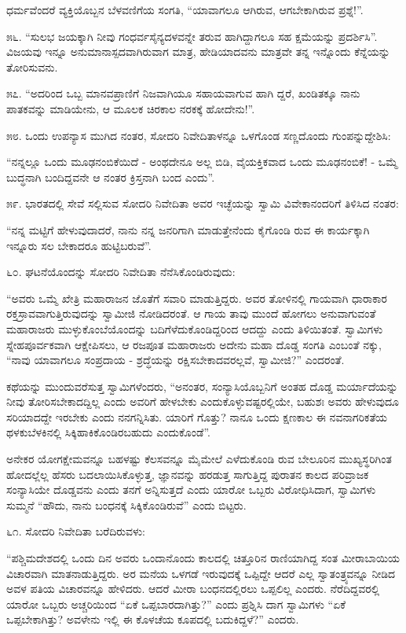 ಧರ್ಮವೆಂದರೆ ವ್ಯಕ್ತಿಯೊಬ್ಬನ ಬೆಳವಣಿಗೆಯ ಸಂಗತಿ, “ಯಾವಾಗಲೂ ಆಗಿರುವ, ಆಗಬೇಕಾಗಿರುವ ಪ್ರಶ್ನೆ!”. 

೫೬. “ಸುಲಭ ಜಯಕ್ಕಾಗಿ ನೀವು ಗಂಧರ್ವಸೈನ್ಯದಳವನ್ನೇ ತರುವ ಹಾಗಿದ್ದಾಗಲೂ ಸಹ ಕ್ಷಮೆಯನ್ನು ಪ್ರದರ್ಶಿಸಿ”. ವಿಜಯವು ಇನ್ನೂ ಅನುಮಾನಾಸ್ಪದವಾಗಿರುವಾಗ ಮಾತ್ರ, ಹೇಡಿಯಾದವನು ಮಾತ್ರವೇ ತನ್ನ ಇನ್ನೊಂದು ಕೆನ್ನೆಯನ್ನು ತೋರಿಸುವನು. 

೫೭. “ಅದರಿಂದ ಒಬ್ಬ ಮಾನವಪ್ರಾಣಿಗೆ ನಿಜವಾಗಿಯೂ ಸಹಾಯವಾಗುವ ಹಾಗಿ ದ್ದರೆ, ಖಂಡಿತಕ್ಕೂ ನಾನು ಪಾತಕವನ್ನು ಮಾಡಿಯೇನು, ಆ ಮೂಲಕ ಚಿರಕಾಲ ನರಕಕ್ಕೆ ಹೋದೇನು!”. 

೫೮. ಒಂದು ಉಪನ್ಯಾಸ ಮುಗಿದ ನಂತರ, ಸೋದರಿ ನಿವೇದಿತಾಳನ್ನೂ ಒಳಗೊಂಡ ಸಣ್ಣದೊಂದು ಗುಂಪನ್ನುದ್ದೇಶಿಸಿ:

“ನನ್ನಲ್ಲೂ ಒಂದು ಮೂಢನಂಬಿಕೆಯಿದೆ - ಅಂಥದೇನೂ ಅಲ್ಲ ಬಿಡಿ, ವೈಯಕ್ತಿಕವಾದ ಒಂದು ಮೂಢನಂಬಿಕೆ! - ಒಮ್ಮೆ ಬುದ್ಧನಾಗಿ ಬಂದಿದ್ದವನೇ ಆ ನಂತರ ಕ್ರಿಸ್ತನಾಗಿ ಬಂದ ಎಂದು”. 

೫೯. ಭಾರತದಲ್ಲಿ ಸೇವೆ ಸಲ್ಲಿಸುವ ಸೋದರಿ ನಿವೇದಿತಾ ಅವರ ಇಚ್ಛೆಯನ್ನು ಸ್ವಾಮಿ ವಿವೇಕಾನಂದರಿಗೆ ತಿಳಿಸಿದ ನಂತರ:

“ನನ್ನ ಮಟ್ಟಿಗೆ ಹೇಳುವುದಾದರೆ, ನಾನು ನನ್ನ ಜನರಿಗಾಗಿ ಮಾಡುತ್ತೇನೆಂದು ಕೈಗೊಂಡಿ ರುವ ಈ ಕಾರ್ಯಕ್ಕಾಗಿ ಇನ್ನೂರು ಸಲ ಬೇಕಾದರೂ ಹುಟ್ಟಿಬರುವೆ”. 

೬೦. ಘಟನೆಯೊಂದನ್ನು ಸೋದರಿ ನಿವೇದಿತಾ ನೆನೆಸಿಕೊಂಡಿರುವುದು:

“ಅವರು ಒಮ್ಮೆ ಖೇತ್ರಿ ಮಹಾರಾಜನ ಜೊತೆಗೆ ಸವಾರಿ ಮಾಡುತ್ತಿದ್ದರು. ಅವರ ತೋಳಿನಲ್ಲಿ ಗಾಯವಾಗಿ ಧಾರಾಕಾರ ರಕ್ತಸ್ರಾವವಾಗುತ್ತಿರುವುದನ್ನು ಸ್ವಾಮೀಜಿ ನೋಡಿದರಂತೆ. ಆ ಗಾಯ ತಾವು ಮುಂದೆ ಹೋಗಲು ಅನುವಾಗುವಂತೆ ಮಹಾರಾಜರು ಮುಳ್ಳುಕೊಂಬೆಯೊಂದನ್ನು ಬದಿಗೆಳೆದುಕೊಂಡಿದ್ದರಿಂದ ಆದದ್ದು ಎಂದು ತಿಳಿಯಿತಂತೆ. ಸ್ವಾಮಿಗಳು ಸ್ನೇಹಪೂರ್ವಕವಾಗಿ ಆಕ್ಷೇಪಿಸಲು, ಆ ರಜಪೂತ ಮಹಾರಾಜರು ಅದೇನು ಮಹಾ ದೊಡ್ಡ ಸಂಗತಿ ಎಂಬಂತೆ ನಕ್ಕು, “ನಾವು ಯಾವಾಗಲೂ ಸಂಪ್ರದಾಯ - ಶ್ರದ್ಧೆಯನ್ನು ರಕ್ಷಿಸಬೇಕಾದವರಲ್ಲವೆ, ಸ್ವಾಮೀಜಿ?” ಎಂದರಂತೆ.

ಕಥೆಯನ್ನು ಮುಂದುವರೆಸುತ್ತ ಸ್ವಾಮಿಗಳೆಂದರು, “ಅನಂತರ, ಸಂನ್ಯಾಸಿಯೊಬ್ಬನಿಗೆ ಅಂತಹ ದೊಡ್ಡ ಮರ್ಯಾದೆಯನ್ನು ನೀವು ತೋರಿಸಬೇಕಾದದ್ದಿಲ್ಲ ಎಂದು ಅವರಿಗೆ ಹೇಳಬೇಕು ಎಂದುಕೊಳ್ಳುವಷ್ಟರಲ್ಲಿಯೇ, ಬಹುಶಃ ಅವರು ಹೇಳುವುದೂ ಸರಿಯಾದದ್ದೇ ಇರಬೇಕು ಎಂದು ನನಗನ್ನಿಸಿತು. ಯಾರಿಗೆ ಗೊತ್ತು? ನಾನೂ ಒಂದು ಕ್ಷಣಕಾಲ ಈ ನವನಾಗರಿಕತೆಯ ಥಳಕುಬೆಳಕಿನಲ್ಲಿ ಸಿಕ್ಕಿಹಾಕಿಕೊಂಡಿರಬಹುದು ಎಂದುಕೊಂಡೆ”.

ಅನೇಕರ ಯೋಗಕ್ಷೇಮವನ್ನೂ ಬಹಳಷ್ಟು ಕೆಲಸವನ್ನೂ ಮೈಮೇಲೆ ಎಳೆದುಕೊಂಡಿ ರುವ ಬೇಲೂರಿನ ಮುಖ್ಯಸ್ಥರಿಗಿಂತ ಹೋದಲ್ಲೆಲ್ಲ ಹೆಸರು ಬದಲಾಯಿಸಿಕೊಳ್ಳುತ್ತ, ಜ್ಞಾನವನ್ನು ಹರಡುತ್ತ ಸಾಗುತ್ತಿದ್ದ ಪುರಾತನ ಕಾಲದ ಪರಿವ್ರಾಜಕ ಸಂನ್ಯಾಸಿಯೇ ದೊಡ್ಡವನು ಎಂದು ತನಗೆ ಅನ್ನಿಸುತ್ತದೆ ಎಂದು ಯಾರೋ ಒಬ್ಬರು ವಿರೋಧಿಸಿದಾಗ, ಸ್ವಾಮಿಗಳು ಸುಮ್ಮನೆ “ಹೌದು, ನಾನು ಬಂಧನಕ್ಕೆ ಸಿಕ್ಕಿಕೊಂಡಿರುವೆ” ಎಂದು ಬಿಟ್ಟರು. 

೬೧. ಸೋದರಿ ನಿವೇದಿತಾ ಬರೆದಿರುವಳು:

“ಪಶ್ಚಿಮದೇಶದಲ್ಲಿ ಒಂದು ದಿನ ಅವರು ಒಂದಾನೊಂದು ಕಾಲದಲ್ಲಿ ಚಿತ್ತೂರಿನ ರಾಣಿಯಾಗಿದ್ದ ಸಂತ ಮೀರಾಬಾಯಿಯ ವಿಚಾರವಾಗಿ ಮಾತನಾಡುತ್ತಿದ್ದರು. ಅರ ಮನೆಯ ಒಳಗಡೆ ಇರುವುದಕ್ಕೆ ಒಪ್ಪಿದ್ದೇ ಆದರೆ ಎಲ್ಲ ಸ್ವಾತಂತ್ರ್ಯವನ್ನೂ ನೀಡಿದ ಅವಳ ಪತಿಯ ವಿಚಾರವನ್ನೂ ಹೇಳಿದರು. ಆದರೆ ಮೀರಾ ಬಂಧನದಲ್ಲಿರಲು ಒಪ್ಪಲಿಲ್ಲ ಎಂದರು. ನೆರೆದಿದ್ದವರಲ್ಲಿ ಯಾರೋ ಒಬ್ಬರು ಅಚ್ಚರಿಯಿಂದ “ಏಕೆ ಒಪ್ಪಬಾರದಾಗಿತ್ತು?” ಎಂದು ಪ್ರಶ್ನಿಸಿ ದಾಗ ಸ್ವಾಮಿಗಳು “ಏಕೆ ಒಪ್ಪಬೇಕಾಗಿತ್ತು? ಅವಳೇನು ಇಲ್ಲಿ ಈ ಕೊಳಚೆಯ ಕೂಪದಲ್ಲಿ ಬದುಕಿದ್ದಳೆ?” ಎಂದರು. 

